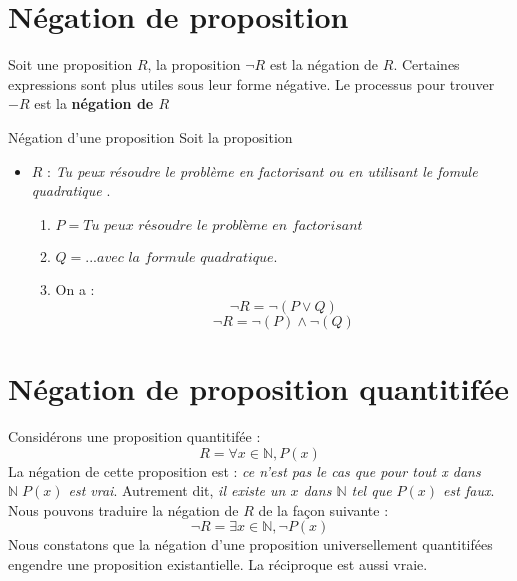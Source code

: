 \documentclass[16pt]{report}
\begin{document}
\begin{multicols*}{2}
            

           \section{Négation de proposition}
            Soit une proposition $R$, la proposition $\neg R$ est la négation de $R$. Certaines expressions sont 
            plus utiles sous leur forme négative. Le processus pour trouver $-R$ est la \textbf{négation de $R$}  
        
    
            \begin{EExample}{Négation d'une proposition}{}
                Soit la proposition 
                \begin{itemize}
                    \item $R$ :
                    \textit{Tu peux résoudre le problème en factorisant ou en utilisant le fomule quadratique }.
                    \begin{enumerate}
                        \item $P = \textit{Tu peux résoudre le problème en factorisant}$ 
                        \item $Q = \textit{...avec la formule quadratique}$. 
                        \item On a : 
                             \[ \neg R = \neg (P \lor Q) \]
                             \[ \neg R = \neg(P) \land \neg(Q) \] 
                    \end{enumerate}
                \end{itemize} 
            \end{EExample} 



            \section{Négation de proposition quantitifée} 

            Considérons une proposition quantitifée : 
            \[ R = \forall x \in \mathbb{N}, P(x)\]
            La négation de cette proposition est : 
            \textit{ce n'est pas le cas que pour tout x dans $\mathbb{N} \; P(x)$ est vrai}. Autrement dit, 
            \textit{il existe un $x$ dans $\mathbb{N}$ tel que $P(x)$ est faux}. Nous pouvons traduire la négation 
            de $R$ de la façon suivante : 
            \[ \neg R = \exists x \in \mathbb{N}, \neg P(x) \]
            Nous constatons que la négation d'une proposition universellement quantitifées engendre une 
            proposition existantielle. La réciproque est aussi vraie. 



\end{multicols*}
\end{document}
